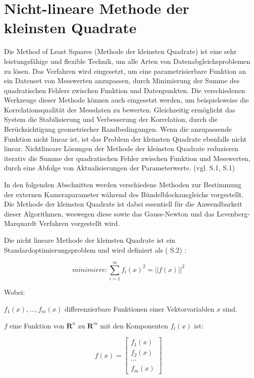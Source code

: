 \section{Nicht-lineare Methode der kleinsten Quadrate}
Die \glqq Method of Least Squares\grqq{} (Methode der kleinsten Quadrate) ist eine sehr leistungsfähige und flexible Technik, um alle Arten von Datenabgleichsproblemen zu lösen. Das Verfahren wird eingesetzt, um eine parametrisierbare Funktion an ein Datenset von Messwerten anzupassen, durch Minimierung der Summe des quadratischen Fehlers zwischen Funktion und Datenpunkten. Die verschiedenen Werkzeuge dieser Methode können auch eingesetzt werden, um beispielsweise die Korrelationsqualität der Messdaten zu bewerten. Gleichzeitig ermöglicht das System die Stabilisierung und Verbesserung der Korrelation, durch die Berücksichtigung geometrischer Randbedingungen. Wenn die anzupassende Funktion nicht linear ist, ist das Problem der kleinsten Quadrate ebenfalls nicht linear. Nichtlineare Lösungen der Methode der kleinsten Quadrate reduzieren iterativ die Summe der quadratischen Fehler zwischen Funktion und Messwerten, durch eine Abfolge von Aktualisierungen der Parameterwerte. (vgl. \cite{least_quares} S.1, \cite{lev_mar} S.1)

In den folgenden Abschnitten werden verschiedene Methoden zur Bestimmung der externen Kameraparameter während des Bündelblockausgleichs vorgestellt. Die Methode der kleinsten Quadrate ist dabei essentiell für die Anwendbarkeit dieser Algorithmen, weswegen diese sowie das Gauss-Newton und das Levenberg-Marquardt Verfahren vorgestellt wird. 

Die nicht lineare Methode der kleinsten Quadrate ist ein Standardoptimierungsproblem und wird definiert als (\cite{nonlinear_1} S.2) :

\begin{equation}
minimiere: \sum_{i=1}^m f_i(x)^2 =  ||f(x)||^2
\end{equation} 

Wobei: 

$f_1(x),...,f_m(x)$ differenzierbare Funktionen einer Vektorvariablen $x$ sind.

$f$ eine Funktion von $\textbf{R}^n$ zu $\textbf{R}^m$ mit den Komponenten $f_i(x)$ ist:

\begin{equation}
f(x) = \begin{bmatrix}
f_1(x)\\ f_2(x)\\ \cdots \\ f_m(x)
\end{bmatrix}
\end{equation} 

